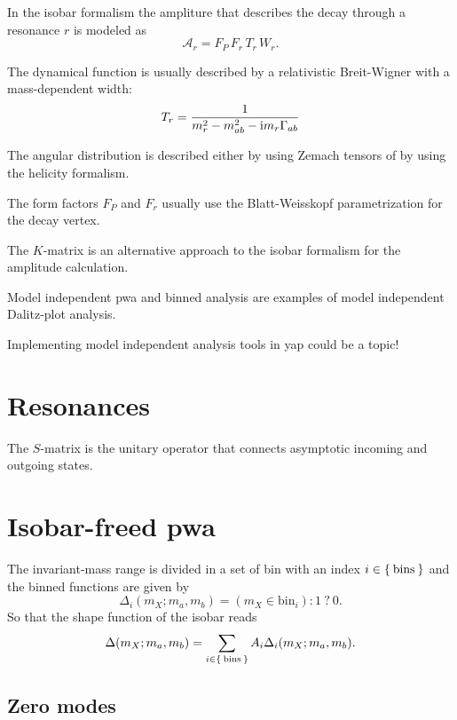\documentclass[
	fontsize=10pt,
	open=right,
	twoside,
    english,
    draft,
]{scrbook}
\newcommand{\A}{\ensuremath{\mathcal{A}}}
\begin{document}
In the isobar formalism the ampliture that describes the decay through a resonance $r$ is modeled as
\begin{equation}
    \A_r = F_P\,F_r\, T_r\, W_r.
\end{equation}

The dynamical function is usually described by a relativistic Breit-Wigner with a mass-dependent width:
\begin{equation}
    T_r = \frac{1}{m_r^2 - m_{ab}^2 - \mathrm{i} m_r \Gamma_{ab}}
\end{equation}

The angular distribution is described either by using Zemach tensors of by using the helicity formalism.


The form factors $F_P$ and $F_r$ usually use the Blatt-Weisskopf parametrization for the decay vertex.


The $K$-matrix is an alternative approach to the isobar formalism for the amplitude calculation.


Model independent \gls{pwa} and binned analysis are examples of model independent Dalitz-plot analysis.



Implementing model independent analysis tools in \gls{yap} could be a topic!

\section{Resonances}

The $S$-matrix is the unitary operator that connects asymptotic incoming and outgoing states.


\section{Isobar-freed \gls{pwa}}

The invariant-mass range is divided in a set of bin with an index $i \in \Set{ \text{bins} }$ and the binned functions are given by
\begin{equation}
    \Delta_i(m_X; m_a, m_b) = ( m_X \in \text{bin}_i) : 1\  ?\  0.
\end{equation}
So that the shape function of the isobar reads
\begin{equation}
    \Delta(m_X; m_a, m_b) = \sum_{i\in \Set{\text{bins}}} A_i \Delta_i(m_X;m_a, m_b).
\end{equation}

    \subsection{Zero modes}
\end{document}

